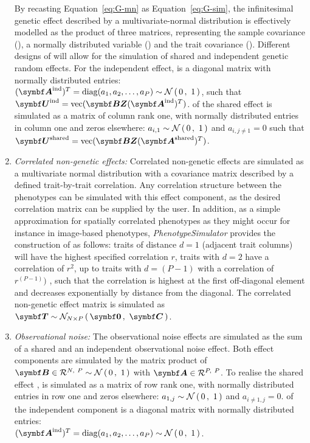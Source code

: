 \begin{enumerate}
By recasting Equation~\ref{eq:G-mn} as Equation~\ref{eq:G-sim}, the infinitesimal genetic effect  described by a multivariate-normal distribution is effectively modelled as the product of three matrices, representing the sample covariance (), a normally distributed variable () and the trait covariance (). Different designs of  will allow for the simulation of shared and independent genetic random effects. For the independent effect,  is a diagonal matrix with normally distributed entries: \((\matsup{A}{ind})^T = \text{diag}(a_1, a_2,  \dotsc , a_P) \sim \normal 0 1\), such that \(\matsup{U}{ind} =  \text{vec}(\mat{BZ}(\matsup{A}{ind})^T) \).  of the shared effect is simulated as a matrix of column rank one, with normally distributed entries in column one and zeros elsewhere: \(a_{i,1} \sim \mathcal{N}\left(\,{0}\,,~{1}\,\right)\) and \(a_{i,j \neq 1} = 0\) such that \(\matsup{U}{shared} =  \text{vec}(\mat{BZ}(\matsup{A}{shared})^T) \).  
%
\item \textit{Correlated non-genetic effects:}  Correlated non-genetic effects are simulated as a multivariate normal distribution with a covariance matrix described by a defined trait-by-trait correlation. Any correlation structure between the phenotypes can be simulated with this effect component, as the desired correlation matrix  can be supplied by the user. In addition, as a simple approximation for spatially correlated phenotypes as they might occur for instance in image-based phenotypes, \textit{PhenotypeSimulator} provides the construction of  as follows: traits of distance \(d=1\) (adjacent trait columns) will have the highest specified correlation \(r\), traits with \(d=2\) have a correlation of \(r^2\), up to traits with \(d=(P - 1)\) with a correlation of \(r^{(P - 1)})\) , such that the correlation is highest at the first off-diagonal element and decreases exponentially by distance from the diagonal. The correlated non-genetic effect matrix is simulated as \(\mat{T} \sim \multinormal N P {\mat{0}} {\mat{C}}\).
%
\item \textit{Observational noise:} The observational noise effects \tmat{\Psi} are simulated as the sum of a shared and an independent observational noise effect. Both effect components are simulated by the matrix product of \(\mat{B} \inR N P   \sim \normal  0 1\) with \(\mat{A} \inR P P \). To realise the shared effect ,  is simulated as a matrix of row rank one, with normally distributed entries in row one and zeros elsewhere: \(a_{1,j} \sim \mathcal{N}\left(\,{0}\,,~{1}\,\right)\) and \(a_{i \neq 1,j} = 0\).   of the independent component is a diagonal matrix with normally distributed entries:\\ \((\matsup{A}{ind})^T = \text{diag}(a_1, a_2,  \dotsc , a_P) \sim \normal 0 1\).
\end{enumerate}
%

